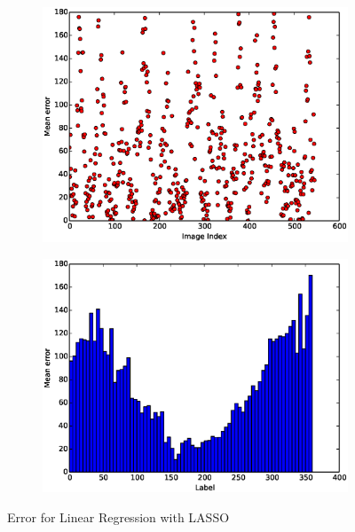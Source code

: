 \documentclass{article}
\begin{document}
\begin{figure}[H]
  \begin{subfigure}[!h]{0.5\textwidth}
    \centering
    \includegraphics[width=\textwidth]{./woodley/LASSO_heading_plot.eps}
  \end{subfigure}
  \begin{subfigure}[!h]{0.5\textwidth}
    \centering
    \includegraphics[width=\textwidth]{./woodley/LASSO_heading_bar.eps}
  \end{subfigure}
  \caption{Error for Linear Regression with LASSO}
\end{figure}
\end{document}
